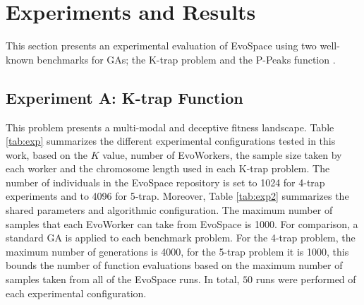 \section{Experiments and Results}
\label{sec:exp1}
This section presents an experimental evaluation of EvoSpace using two well-known benchmarks for GAs;
the K-trap problem \cite{trap} and the P-Peaks function
\cite{Jong:PS97}. %

\subsection{Experiment A: K-trap Function}
This problem presents a multi-modal and deceptive fitness landscape.
Table \ref{tab:exp} summarizes the different experimental configurations tested in this work, based on the $K$ value, number of EvoWorkers, the sample size taken by each worker and the chromosome length used in each K-trap problem. The number of individuals in the EvoSpace repository is set to 1024 for 4-trap experiments and to 4096 for 5-trap.
Moreover, Table \ref{tab:exp2} summarizes the shared parameters and algorithmic configuration.
The maximum number of samples that each EvoWorker can take from EvoSpace is 1000.
For comparison, a standard GA is applied to each benchmark problem.
For the 4-trap problem, the maximum number of generations is 4000, for the 5-trap problem it is 1000,
this bounds the number of function evaluations based on the maximum number of samples taken from all of the EvoSpace runs.
In total, $50$ runs were performed of each experimental configuration.


